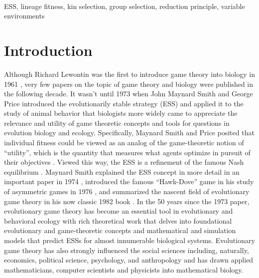 \documentclass[11pt]{article}
\begin{document}
\vspace{3em}
\\
ESS, lineage fitness, kin selection, group selection, reduction principle, variable environments

\clearpage
\section{Introduction}

Although Richard Lewontin was the first to introduce game theory into biology in 1961 \cite{Lewontin:1961}, very few papers on the topic of game theory and biology were published in the following decade. It wasn't until 1973 when John Maynard Smith and George Price introduced the evolutionarily stable strategy (ESS) and applied it to the study of animal behavior \cite{Maynard-Smith:Price:1973} that biologists more widely came to appreciate the relevance and utility of game theoretic concepts and tools for questions in evolution biology and ecology. Specifically, Maynard Smith and Price posited that individual fitness could be viewed as an analog of the game-theoretic notion of ``utility'', which is the quantity that measures what agents optimize in pursuit of their objectives \cite{Myerson:1991}. Viewed this way, the ESS is a refinement of the famous Nash equilibrium \cite{Nash:1950}. Maynard Smith explained the ESS concept in more detail in an important paper in 1974 \cite{Maynard-Smith:1974}, introduced the famous ``Hawk-Dove'' game in his study of asymmetric games in 1976 \cite{Maynard-Smith:Parker:1976}, and summarized the nascent field of evolutionary game theory in his now classic 1982 book \cite{MaynardSmith:1982}. In the 50 years since the 1973 paper, evolutionary game theory has become an essential tool in evolutionary and behavioral ecology with rich theoretical work that delves into foundational evolutionary and game-theoretic concepts and mathematical and simulation models that predict ESSs for almost innumerable biological systems. Evolutionary game theory has also strongly influenced the social sciences including, naturally, economics, political science, psychology, and anthropology and has drawn applied mathematicians, computer scientists and physicists into mathematical biology.
\end{document}
